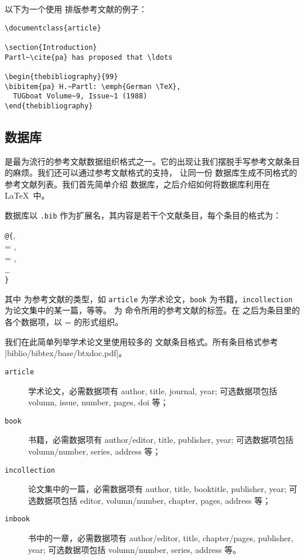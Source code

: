 以下为一个使用  排版参考文献的例子：

\begin{verbatim}
\documentclass{article}

\section{Introduction}
Partl~\cite{pa} has proposed that \ldots

\begin{thebibliography}{99}
\bibitem{pa} H.~Partl: \emph{German \TeX}, 
  TUGboat Volume~9, Issue~1 (1988)
\end{thebibliography}

\end{verbatim}

\subsection{ 数据库}

 是最为流行的参考文献数据组织格式之一。它的出现让我们摆脱手写参考文献条目的麻烦。我们还可以通过参考文献格式的支持，
让同一份  数据库生成不同格式的参考文献列表。我们首先简单介绍  数据库，之后介绍如何将数据库利用在 \LaTeX\ 中。

 数据库以 \texttt{.bib} 作为扩展名，其内容是若干个文献条目，每个条目的格式为：
\begin{command}
\texttt @\texttt\{, \\
\qquad{} = , \\
\qquad{} = , \\
\qquad\ldots\\
\texttt\}
\end{command}

其中  为参考文献的类型，如 \texttt{article} 为学术论文，\texttt{book} 为书籍，\texttt{in\-collection} 为论文集中的某一篇，等等。
 为  命令所用的参考文献的标签。在  之后为条目里的各个数据项，以  =  的形式组织。

我们在此简单列举学术论文里使用较多的  文献条目格式。所有条目格式参考 \CTAN|biblio/bibtex/base/btxdoc.pdf|。
\begin{description}
  \item[\texttt{article}] 学术论文，必需数据项有 author, title, journal, year; 可选数据项包括 volumn, issue, number, pages, doi 等；
  \item[\texttt{book}] 书籍，必需数据项有 author/editor, title, publisher, year; 可选数据项包括 volumn/number, series, address 等；
  \item[\texttt{incollection}] 论文集中的一篇，必需数据项有 author, title, booktitle, publisher, year; 可选数据项包括 editor, volumn/number, chapter, pages, address 等；
  \item[\texttt{inbook}] 书中的一章，必需数据项有 author/editor, title, chapter/pages, publisher, year; 可选数据项包括 volumn/number, series, address 等。
\end{description}

